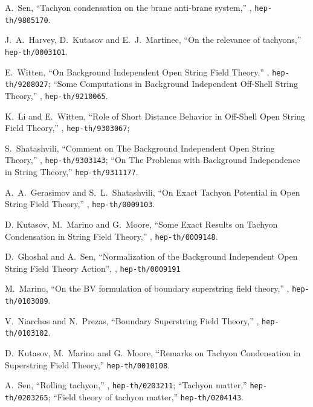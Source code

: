\documentclass[a4paper,12pt]{article}
\begin{document}
\begin{thebibliography}{99}


A.~Sen,
``Tachyon condensation on the brane anti-brane system,''
, {\tt hep-th/9805170}.

J.~A.~Harvey, D.~Kutasov and E.~J.~Martinec,
``On the relevance of tachyons,'' {\tt hep-th/0003101}.

E.\ Witten,
  { ``On Background Independent Open String Field Theory,''}
  , {\tt hep-th/9208027}; 
  { ``Some Computations in Background Independent Off-Shell String
    Theory,''}
  , {\tt hep-th/9210065}.

  K.\ Li and E.\ Witten, 
  { ``Role of Short Distance Behavior in Off-Shell Open String
    Field Theory,''} 
  , {\tt hep-th/9303067};

  S.\ Shatashvili,
  { ``Comment on The Background Independent Open String Theory,''}
  , {\tt hep-th/9303143}; 
  { ``On The Problems with Background Independence in String
    Theory,''} {\tt hep-th/9311177}.



  A.\ A.\ Gerasimov and S.\ L.\ Shatashvili, 
  { ``On Exact Tachyon Potential in Open String Field Theory,''}
  , {\tt hep-th/0009103}.

  D. Kutasov, M.\ Marino and G.\ Moore,
  { ``Some Exact Results on Tachyon Condensation in String Field
    Theory,''}
   , {\tt hep-th/0009148}.

  D.\ Ghoshal and A.\ Sen, 
    { ``Normalization of the Background Independent Open String Field
             Theory Action''}, ,  
   {\tt hep-th/0009191}

  M.\ Marino,     { ``On the BV formulation of boundary superstring
    field theory,''} ,
   {\tt hep-th/0103089}.

  V.\ Niarchos and N.\ Prezas,
    { ``Boundary Superstring Field Theory,''}
  , {\tt hep-th/0103102}.

D.\ Kutasov, M.\ Marino and G.\ Moore,
``Remarks on Tachyon Condensation in Superstring Field Theory,''
 {\tt hep-th/0010108}.

A.~Sen,
``Rolling tachyon,''
,
{\tt hep-th/0203211};
``Tachyon matter,''
{\tt hep-th/0203265};
``Field theory of tachyon matter,''
{\tt hep-th/0204143}.


\end{thebibliography}
\end{document}
